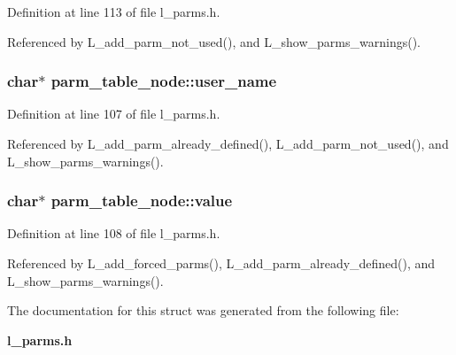 Definition at line 113 of file l\_\-parms.h.

Referenced by L\_\-add\_\-parm\_\-not\_\-used(), and L\_\-show\_\-parms\_\-warnings().
\subsubsection{\setlength{\rightskip}{0pt plus 5cm}char$\ast$ \bf{parm\_\-table\_\-node::user\_\-name}}\label{structparm__table__node_47f9d69859af678502c818958274ee6c}




Definition at line 107 of file l\_\-parms.h.

Referenced by L\_\-add\_\-parm\_\-already\_\-defined(), L\_\-add\_\-parm\_\-not\_\-used(), and L\_\-show\_\-parms\_\-warnings().
\subsubsection{\setlength{\rightskip}{0pt plus 5cm}char$\ast$ \bf{parm\_\-table\_\-node::value}}\label{structparm__table__node_7d8d917d112c838da4ce9bcfa5441f1b}




Definition at line 108 of file l\_\-parms.h.

Referenced by L\_\-add\_\-forced\_\-parms(), L\_\-add\_\-parm\_\-already\_\-defined(), and L\_\-show\_\-parms\_\-warnings().

The documentation for this struct was generated from the following file:\begin{CompactItemize}
\item 
\bf{l\_\-parms.h}\end{CompactItemize}
